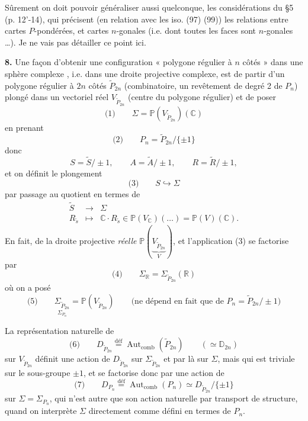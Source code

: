 \documentclass[11pt,a4paper]{article}
\begin{document}
Sûrement on doit pouvoir généraliser aussi \ill{} quelconque, les considérations du §5 (p. 12'-14), qui précisent (en relation avec \struck{\ill{}} les iso. (97) (99)) les relations entre cartes $P$-pondérées, et cartes $n$-gonales (i.e. dont toutes les faces sont $n$-gonales …). Je ne vais pas détailler ce point ici.

\textbf{8.} Une façon d'obtenir une configuration « polygone régulier à $n$ côtés »  dans une sphère complexe \add{$\Sigma$}, \struck{\ill{}} i.e. dans une droite projective complexe, est de partir d'un polygone régulier à $2n$ côtés $\tilde P_{2n}$ (combinatoire, un revêtement de degré 2 de $P_n$) plongé dans un   vectoriel réel $V_{\tilde P_{2n}}$ (centre du polygone régulier) et de poser
\[
  \text{(1)}\qquad \Sigma = \mathbb{P}(V_{\tilde P_{2n}})(\mathbb{C})
\]
en prenant
\[
  \text{(2)}\qquad P_n = \tilde P_{2n}/\{\pm 1\}
\]
 donc
\[
  S = \tilde S/\pm 1, \qquad A = \tilde A/\pm 1, \qquad R = \tilde R/\pm 1 ,
\]
et on définit le plongement
\[
  \text{(3)}\qquad S \hookrightarrow \Sigma
\]
par passage au quotient en termes de
\[
  \begin{array}{rcl}
    \tilde S & \longrightarrow & \Sigma \\
    R_{\tilde s} & \longmapsto & \mathbb{C}\cdot R_{\tilde s} \in \mathbb{P}(V_{\mathbb{C}})(\ldots) = \mathbb{P}(V)(\mathbb{C}) .
  \end{array}
\]
 \struck{\ill{}} En fait,  de la droite projective \emph{réelle} $\mathbb{P}(\underbrace{V_{\tilde P_{2n}}}_{V})$, et l'application (3) se factorise par \struck{\ill{}}
\[
  \text{(4)}\qquad \Sigma_{\mathbb{R}} = \Sigma_{\tilde P_{2n}}(\mathbb{R})
\]
où on a posé
\[
  \text{(5)}\qquad \underset{\textstyle \Sigma_{P_n}}{\Sigma_{\tilde P_{2n}}} = \mathbb{P}(V_{\tilde P_{2n}})
  \qquad \text{(ne dépend en fait que de } P_n = \tilde P_{2n}/\pm 1\text{)}
\]

La représentation naturelle de 
\[
  \text{(6)}\qquad D_{\tilde P_{2n}} \overset{\text{déf}}{=} \operatorname{Aut}_{\text{comb}}(\tilde P_{2n}) \qquad (\simeq \mathbb{D}_{2n})
\]
sur $V_{\tilde P_{2n}}$ définit une action de $D_{\tilde P_{2n}}$ sur $\Sigma_{\tilde P_{2n}}$ et par là sur $\Sigma$, mais qui est triviale sur le sous-groupe $\pm 1$, et se factorise donc par une action de
\[
  \text{(7)}\qquad D_{P_n} \overset{\text{déf}}{=} \operatorname{Aut}_{\text{comb}}(P_n) \simeq D_{\tilde P_{2n}}/\{\pm 1\}
\]
sur $\Sigma = \Sigma_{P_n}$, qui n'est autre que son action naturelle par transport de structure, quand on interprète $\Sigma$ directement comme défini en termes de $P_n$.
\end{document}
